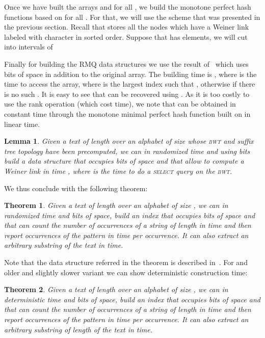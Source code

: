 \documentclass[a4paper]{article}
\newtheorem{lemma}{Lemma}
\newtheorem{theorem}{Theorem}
\begin{document}
\begin{enumerate}
Once we have built the arrays  and  for all , 
we build the monotone perfect hash functions  based on 
for all . 
For that, we will use the scheme that was presented in the previous section. 
Recall that  stores all the nodes which have a Weiner link 
labeled with character  in sorted order. Suppose that 
has  elements, we will cut  into intervals of 



Finally for building the RMQ data structures we use the 
result of~\cite{Fi10} which uses  bits of space 
in addition to the original array. The building time 
is , where  is the time 
to access the  array, where  is the largest index 
such that , otherwise  
if there is no such  . It is easy to see that  
can be recovered using . 
As it is too costly to use the rank operation (which cost  
time), we note that  can be obtained in constant time through the monotone 
minimal perfect hash function built on  in linear time. 

\begin{lemma}
\label{lemma:weiner_link_support}
Given a text of length  over an alphabet of size  
whose \textsc{bwt} and suffix tree topology 
have been precomputed, we can in  randomized time and using 
bits build a data structure that occupies  bits of space
and that allow to compute a Weiner link in time , 
where  is the time to do a \textsc{select} query on the \textsc{bwt}. 
\end{lemma}
We thus conclude with the following theorem:
\begin{theorem}
Given a text of length  over an alphabet of size , 
we can in randomized  time and  bits 
of space, build an index that occupies  
bits of space and that can count the number of occurrences 
of a string of length  in time  and then report occurrences of 
the pattern  in  time per occurrence. It can also extract an arbitrary
substring of the text in  time. 
\end{theorem}

Note that the data structure referred in the theorem is described in~\cite{BNtalg14}. 
For and older and slightly slower variant we can show deterministic 
construction time:
\begin{theorem}
Given a text of length  over an alphabet of size , 
we can in deterministic  time and  bits 
of space, build an index that occupies 
 bits of space and that can count the number of occurrences 
of a string of length  in time  and then report occurrences of 
the pattern  in  time per occurrence. It can also extract an arbitrary
substring of length  of the text in  time. 
\end{theorem}


\end{enumerate}
\end{document}
